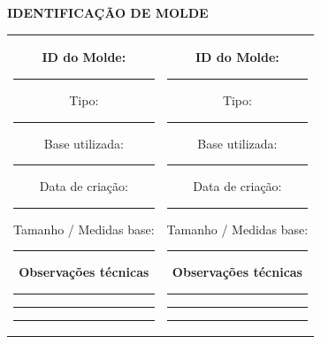 \documentclass[
]{article}
\author{}
\date{\vspace{-2.5em}}
\begin{document}
\vspace*{-0.8cm}

\begin{center}
\normalsize\bfseries IDENTIFICAÇÃO DE MOLDE
\end{center}

\vspace{1cm}

\begin{center}
\setlength{\tabcolsep}{24pt}
\renewcommand{\arraystretch}{1.2}
\begin{tabular}{cc}

\begin{minipage}[t]{0.43\textwidth}
\normalsize

\textbf{ID do Molde:} \rule{4cm}{0.5pt}

\vspace{0.4cm}

Tipo: \rule{5cm}{0.4pt}

Base utilizada: \rule{4cm}{0.4pt}

Data de criação: \rule{3cm}{0.4pt}

Tamanho / Medidas base: \rule{4cm}{0.4pt}

\vspace{0.4cm}

\textbf{Observações técnicas}

\rule{\textwidth}{0.4pt}

\rule{\textwidth}{0.4pt}

\rule{\textwidth}{0.4pt}

\end{minipage}
&
\begin{minipage}[t]{0.43\textwidth}
\normalsize

\textbf{ID do Molde:} \rule{4cm}{0.5pt}

\vspace{0.4cm}

Tipo: \rule{5cm}{0.4pt}

Base utilizada: \rule{4cm}{0.4pt}

Data de criação: \rule{3cm}{0.4pt}

Tamanho / Medidas base: \rule{4cm}{0.4pt}

\vspace{0.4cm}

\textbf{Observações técnicas}

\rule{\textwidth}{0.4pt}

\rule{\textwidth}{0.4pt}

\rule{\textwidth}{0.4pt}

\end{minipage}

\end{tabular}
\end{center}
\end{document}
